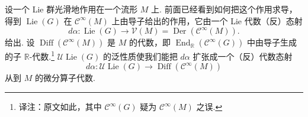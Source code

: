 \begin{numpara}[泛包络代数与微分算子]\label{np:lie-2-1-2}
设一个 Lie 群光滑地作用在一个流形 $M$ 上. 前面已经看到如何把这个作用求导，得到 $\operatorname{Lie}(G)$ 在 $\mathcal C^\infty(M)$ 上由导子给出的作用，它由一个 Lie 代数（反）态射
\[
d\alpha:\operatorname{Lie}(G)\longrightarrow\mathcal V(M)=\operatorname{Der}(\mathcal C^\infty(M)).
\]
给出. 设 $\operatorname{Diff}(\mathcal C^\infty(M))$ 是 $M$ 的代数，即 $\operatorname{End}_{\mathbb R}(\mathcal C^\infty(G))$ 中由导子生成的子 $\mathbb R$-代数.\footnote{译注：原文如此，其中 $\mathcal C^\infty(G)$ 疑为 $\mathcal C^\infty(M)$ 之误.} $\mathcal U\operatorname{Lie}(G)$ 的泛性质使我们能把 $d\alpha$ 扩张成一个（反）代数态射
\[
d\alpha:\mathcal U\operatorname{Lie}(G)\longrightarrow\operatorname{Diff}(\mathcal C^\infty(M))
\]
从到 $M$ 的微分算子代数.
\end{numpara}

